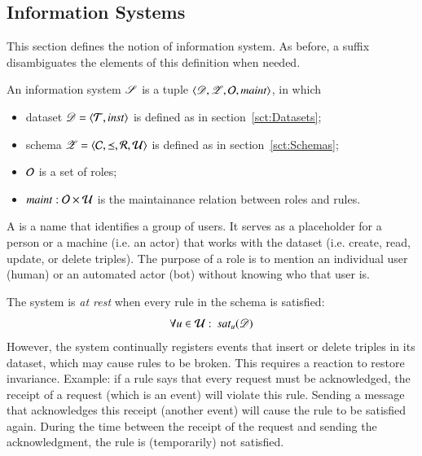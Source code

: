 \documentclass{elsarticle}
\begin{document}
\subsection{Information Systems}
\label{sct:Information Systems}
   This section defines the notion of information system.
   As before, a suffix disambiguates the elements of this definition when needed.
\begin{definition}
\label{def:information system}
\item An information system $\mathscr{S}$ is a tuple $\langle{\mathscr{D}},{\mathscr{Z}},{\mathcal{O}},{\mathbin{\text{\it maint\/}}}\rangle$, in which
\begin{itemize}
   \item dataset $\mathscr{D}=\langle{\mathcal{T}},{\mathbin{\text{\it inst\/}}}\rangle$ is defined as in section~\ref{sct:Datasets};
   \item schema $\mathscr{Z}=\langle{\mathcal{C}},{\preceq},{\mathcal{R}},{\mathcal{U}}\rangle$ is defined as in section~\ref{sct:Schemas};
   \item $\mathcal{O}$ is a set of roles;
   \item ${\mathbin{\text{\it maint\/}}} : \mathcal{O}\times\mathcal{U}$ is the maintainance relation between roles and rules.
\end{itemize}
\end{definition}
   A  is a name that identifies a group of users.
   It serves as a placeholder for a person or a machine (i.e. an actor) that works with the dataset (i.e. create, read, update, or delete triples).
   The purpose of a role is to mention an individual user (human) or an automated actor (bot) without knowing who that user is.

   The system is {\em at rest} when every rule in the schema is satisfied:
\begin{equation}
   \forall u\in\rules:\ \sat{u}{\dataset}\label{eqn:satisfaction}
\end{equation}
   However, the system continually registers events that insert or delete triples in its dataset,
   which may cause rules to be broken.
   This requires a reaction to restore invariance.
   Example: if a rule says that every request must be acknowledged, the receipt of a request (which is an event) will violate this rule.
   Sending a message that acknowledges this receipt (another event) will cause the rule to be satisfied again.
   During the time between the receipt of the request and sending the acknowledgment, the rule is (temporarily) not satisfied.
\end{document}

